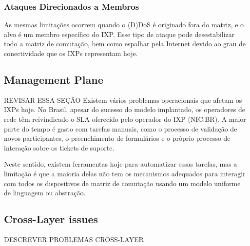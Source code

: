 \documentclass[12pt]{article}
\begin{document}
\subsubsection{Ataques Direcionados a Membros}
As mesmas limitações ocorrem quando o (D)DoS é originado fora do matriz, e o alvo é um membro específico do IXP. Esse tipo de ataque pode desestabilizar todo a matriz de comutação, bem como espalhar pela Internet devido ao grau de conectividade que os IXPs representam hoje.

 
\subsection{Management Plane}
REVISAR ESSA SEÇÃO
Existem vários problemas operacionais que afetam os IXPs hoje. No Brasil, apesar do sucesso do modelo implantado, os operadores de rede têm reivindicado o SLA oferecido pelo operador do IXP (NIC.BR). A maior parte do tempo é gasto com tarefas manuais, como o processo de validação de novos participantes, o preenchimento de formulários e o próprio processo de interação sobre os tickets de suporte.


Neste sentido, existem ferramentas hoje para automatizar essas tarefas, mas a limitação é que a maioria delas não tem os mecanismos adequados para interagir com todos os dispositivos de matriz de comutação usando um modelo uniforme de linguagem ou abstração.


\subsection{Cross-Layer issues}
DESCREVER PROBLEMAS CROSS-LAYER
\end{document}
